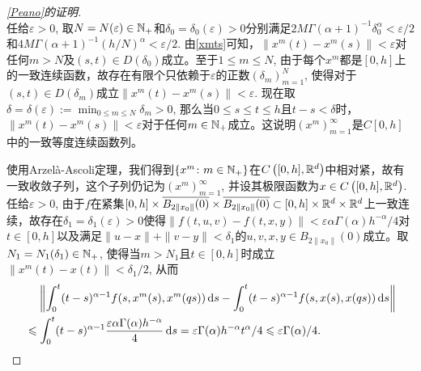 \begin{proof}[\cref{Peano}的证明]
\begin{equation}
    \end{equation}
    任给$\varepsilon>0$, 取$N=N(\varepsilon)\in \mathbb{N_+}$和$\delta_0=\delta_0(\varepsilon)>0$分别满足$2M\Gamma(\alpha+1)^{-1}\delta_0^\alpha < \varepsilon/2$和$4M\Gamma(\alpha+1)^{-1}(h/N)^\alpha<\varepsilon/2$. 由\cref{xmts}可知，$\left\| x^m(t)-x^m(s) \right\| < \varepsilon$对任何$m>N$及$(s,t)\in D(\delta_0)$成立。至于$1\leqslant m\leqslant N$, 由于每个$x^m$都是$[0,h]$上的一致连续函数，故存在有限个只依赖于$\varepsilon$的正数$\left(\delta_m\right)_{m=1}^N$, 使得对于$(s,t)\in D(\delta_m)$成立$\left\| x^m(t)-x^m(s) \right\| < \varepsilon$. 现在取$\delta=\delta(\varepsilon):=\min_{0\leqslant m\leqslant N} \delta_m>0$, 那么当$0\leqslant s\leqslant t \leqslant h$且$t-s<\delta$时，$\left\| x^m(t)-x^m(s) \right\| < \varepsilon$对于任何$m\in \mathbb{N_+}$成立。这说明$\left(x^m\right)_{m=1}^\infty$是$C[0,h]$中的一致等度连续函数列。

    使用Arzel\`a-Ascoli定理，我们得到$\left\{x^m\colon m\in \mathbb{N_+}\right\}$在$C\left([0,h],\mathbb{R}^d\right)$中相对紧，故有一致收敛子列，这个子列仍记为$\left(x^m\right)_{m=1}^\infty$, 并设其极限函数为$x\in C\left([0,h],\mathbb{R}^d\right)$. 任给$\varepsilon>0$, 由于$f$在紧集$[0,h]\times \overline{B_{2\|x_0\|}(0)}\times \overline{B_{2\|x_0\|}(0)}\subset [0,h]\times \mathbb{R}^d\times \mathbb{R}^d$上一致连续，故存在$\delta_1=\delta_1(\varepsilon)>0$使得$\|f(t,u,v)-f(t,x,y)\|<\varepsilon \alpha \Gamma(\alpha) h^{-\alpha} / 4$对$t\in [0,h]$以及满足$\|u-x\|+\|v-y\|<\delta_1$的$u,v,x,y\in B_{2\|x_0\|}(0)$成立。取$N_1=N_1(\delta_1)\in \mathbb{N_+}$, 使得当$m>N_1$且$t\in [0,h]$时成立$\left\|x^m(t)-x(t)\right\|<\delta_1/2$, 从而
    \begin{equation}\label{xmx}
        \begin{aligned}
            &\relphantom{\leqslant}\left\|\int_{0}^{t}(t-s)^{\alpha-1}f(s,x^m(s),x^m(qs))\differential s - \int_{0}^{t}(t-s)^{\alpha-1}f(s,x(s),x(qs))\differential s\right\|
            \\ &\leqslant \int_{0}^{t}(t-s)^{\alpha-1} \frac{\varepsilon \alpha \Gamma(\alpha) h^{-\alpha}}{4} \differential s=\varepsilon \Gamma(\alpha) h^{-\alpha} t^\alpha / 4 \leqslant \varepsilon\Gamma(\alpha)/4.
        \end{aligned}
    \end{equation}


\end{proof}
